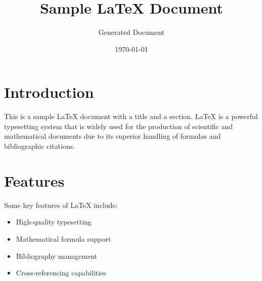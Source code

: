 \documentclass{article}
\title{Sample LaTeX Document}
\author{Generated Document}
\date{\today}
\begin{document}
\maketitle

\section{Introduction}
This is a sample LaTeX document with a title and a section. LaTeX is a powerful typesetting system that is widely used for the production of scientific and mathematical documents due to its superior handling of formulas and bibliographic citations.

\section{Features}
Some key features of LaTeX include:
\begin{itemize}
\item High-quality typesetting
\item Mathematical formula support
\item Bibliography management
\item Cross-referencing capabilities
\end{itemize}
\end{document}
